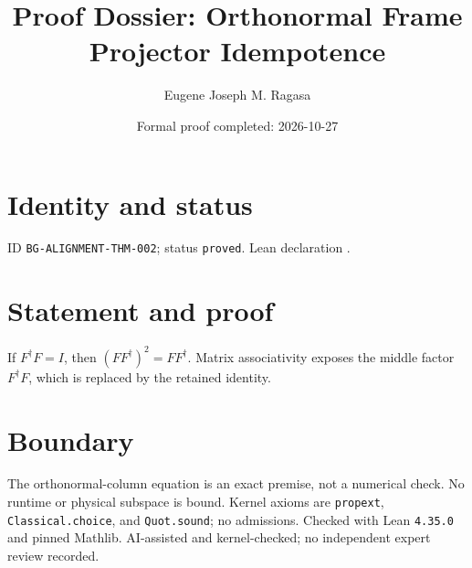 \documentclass[11pt]{article}
\title{Proof Dossier: Orthonormal Frame Projector Idempotence}\author{Eugene Joseph M. Ragasa}\date{Formal proof completed: 2026-10-27}
\begin{document}
\maketitle
\section{Identity and status}
ID \texttt{BG-ALIGNMENT-THM-002}; status \texttt{proved}. Lean declaration .
\section{Statement and proof}
If $F^\dagger F=I$, then $(FF^\dagger)^2=FF^\dagger$. Matrix associativity exposes the middle factor $F^\dagger F$, which is replaced by the retained identity.
\section{Boundary}
The orthonormal-column equation is an exact premise, not a numerical check. No runtime or physical subspace is bound. Kernel axioms are \texttt{propext}, \texttt{Classical.choice}, and \texttt{Quot.sound}; no admissions. Checked with Lean \texttt{4.35.0} and pinned Mathlib. AI-assisted and kernel-checked; no independent expert review recorded.
\end{document}
